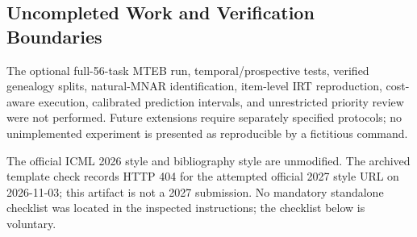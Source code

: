 \documentclass{article}
\begin{document}
\subsection{Uncompleted Work and Verification Boundaries}
The optional full-56-task MTEB run, temporal/prospective tests, verified genealogy splits, natural-MNAR identification, item-level IRT reproduction, cost-aware execution, calibrated prediction intervals, and unrestricted priority review were not performed. Future extensions require separately specified protocols; no unimplemented experiment is presented as reproducible by a fictitious command.

The official ICML 2026 style and bibliography style are unmodified. The archived template check records HTTP 404 for the attempted official 2027 style URL on 2026-11-03; this artifact is not a 2027 submission. No mandatory standalone checklist was located in the inspected instructions; the checklist below is voluntary.
\end{document}
